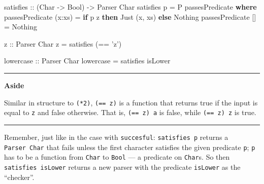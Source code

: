 \documentclass[]{article}
\newenvironment{Shaded}{}{}
\newcommand{\CharTok}[1]{\textcolor[rgb]{0.25,0.44,0.63}{#1}}
\newcommand{\DataTypeTok}[1]{\textcolor[rgb]{0.56,0.13,0.00}{#1}}
\newcommand{\FunctionTok}[1]{\textcolor[rgb]{0.02,0.16,0.49}{#1}}
\newcommand{\KeywordTok}[1]{\textcolor[rgb]{0.00,0.44,0.13}{\textbf{#1}}}
\newcommand{\NormalTok}[1]{#1}
\newcommand{\OtherTok}[1]{\textcolor[rgb]{0.00,0.44,0.13}{#1}}
\begin{document}
\begin{Shaded}
\begin{Highlighting}[]
\OtherTok{satisfies ::}\NormalTok{ (}\DataTypeTok{Char} \OtherTok{->} \DataTypeTok{Bool}\NormalTok{) }\OtherTok{->} \DataTypeTok{Parser} \DataTypeTok{Char}
\NormalTok{satisfies p }\FunctionTok{=} \DataTypeTok{P}\NormalTok{ passesPredicate}
    \KeywordTok{where}
\NormalTok{        passesPredicate (x}\FunctionTok{:}\NormalTok{xs) }\FunctionTok{=}  \KeywordTok{if}\NormalTok{ p z}
                                      \KeywordTok{then} \DataTypeTok{Just}\NormalTok{ (x, xs)}
                                      \KeywordTok{else} \DataTypeTok{Nothing}
\NormalTok{        passesPredicate []     }\FunctionTok{=}  \DataTypeTok{Nothing}


\OtherTok{z ::} \DataTypeTok{Parser} \DataTypeTok{Char}
\NormalTok{z }\FunctionTok{=}\NormalTok{ satisfies (}\FunctionTok{==} \CharTok{'z'}\NormalTok{)}

\OtherTok{lowercase ::} \DataTypeTok{Parser} \DataTypeTok{Char}
\NormalTok{lowercase }\FunctionTok{=}\NormalTok{ satisfies isLower}
\end{Highlighting}
\end{Shaded}

\begin{center}\rule{0.5\linewidth}{\linethickness}\end{center}

\textbf{Aside}

Similar in structure to \texttt{(*2)},
\texttt{(==\ \textquotesingle{}z\textquotesingle{})} is a function that returns
true if the input is equal to \texttt{\textquotesingle{}z\textquotesingle{}} and
false otherwise. That is,
\texttt{(==\ \textquotesingle{}z\textquotesingle{})\ \textquotesingle{}a\textquotesingle{}}
is false, while
\texttt{(==\ \textquotesingle{}z\textquotesingle{})\ \textquotesingle{}z\textquotesingle{}}
is true.

\begin{center}\rule{0.5\linewidth}{\linethickness}\end{center}

Remember, just like in the case with \texttt{succesful}: \texttt{satisfies\ p}
returns a \texttt{Parser\ Char} that fails unless the first character satisfies
the given predicate \texttt{p}; \texttt{p} has to be a function from
\texttt{Char} to \texttt{Bool} --- a predicate on \texttt{Char}s. So then
\texttt{satisfies\ isLower} returns a new parser with the predicate
\texttt{isLower} as the ``checker''.
\end{document}
